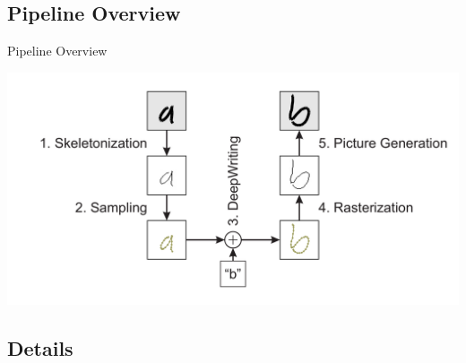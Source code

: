 \documentclass[aspectratio=169]{beamer}
\begin{document}
\subsection{Pipeline Overview}
\begin{frame}{Pipeline Overview}
\begin{center}
\includegraphics[scale=0.35]{pics/pipeline_numbers.pdf}
\end{center}
\end{frame}

\subsection{Details}
\end{document}
